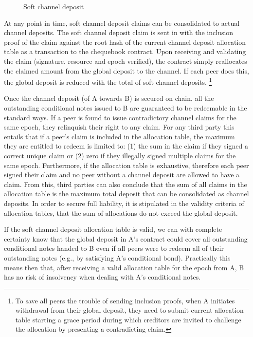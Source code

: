 \begin{center}
\begin{figure}
\begin{center}
\begin{tikzpicture}
\end{tikzpicture}
\end{center}
\caption{Soft channel deposit}
\label{fig:softchanneldeposit}
\end{figure}
\end{center}




At any point in time, soft channel deposit claims can be consolidated to actual
channel deposits.
The soft channel deposit claim is sent in with the inclusion proof of the claim against the root hash of the
current channel deposit allocation table as a transaction to the
chequebook contract. Upon receiving and validating the claim (signature, resource and epoch verified),
the contract simply reallocates the claimed amount from the global deposit to the channel.
If each peer does this, the global deposit is reduced with the total of soft channel
deposits.%
%
\footnote{To save all peers the trouble of sending inclusion proofs, when A initiates withdrawal from
their global deposit, they need to submit current allocation table starting a grace period during which
creditors are invited to challenge the allocation by presenting a contradicting claim.}

Once the channel deposit (of A towards B) is secured on chain, all the outstanding conditional notes
issued to B are guaranteed to be redeemable in the standard ways.
If a peer is found to issue contradictory channel claims for the same epoch, they relinquish
their right to any claim. For any third party this entails that if a peer's claim is
included in the allocation table, the maximum they are entitled to redeem is limited to:
(1) the sum in the claim if they signed a correct unique claim or
(2) zero if they illegally signed multiple claims for the same epoch.
Furthermore, if the allocation table is exhaustive, therefore each
peer signed their claim and no peer without a channel deposit are allowed to have a claim. 
From this, third parties can also conclude that the sum of all claims in the
allocation table is the maximum total deposit that can be consolidated as channel deposits.
In order to secure full liability, it is stipulated in the validity criteria of allocation tables, that the sum of allocations do not exceed the global deposit.

If the soft channel deposit allocation table is valid,
we can with complete certainty know that the global deposit in A's contract
 could cover all outstanding conditional notes handed to B even if all peers were to redeem all of their outstanding notes (e.g., by satisfying A's conditional bond).
Practically this means then that, after receiving a valid allocation table for the epoch from A,
B has no risk of insolvency when dealing with A's conditional notes.

